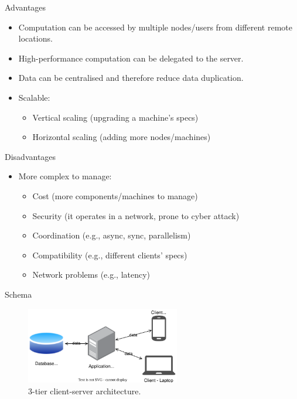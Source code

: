 \documentclass[aspectratio=169, table]{beamer}
\begin{document}
	\begin{frame}{Advantages}
		\begin{itemize}
			\item Computation can be accessed by multiple nodes/users from different remote locations.
			\item High-performance computation can be delegated to the server.
			\item Data can be centralised and therefore reduce data duplication.
			\item Scalable:
			\begin{itemize}
				\item Vertical scaling (upgrading a machine's specs)
				\item Horizontal scaling (adding more nodes/machines)
			\end{itemize}
		\end{itemize}
	\end{frame}
	
	\begin{frame}{Disadvantages}
		\begin{itemize}
			\item More complex to manage:
			\begin{itemize}
				\item Cost (more components/machines to manage)
				\item Security (it operates in a network, prone to cyber attack)
				\item Coordination (e.g., async, sync, parallelism)
				\item Compatibility (e.g., different clients' specs)
				\item Network problems (e.g., latency)
			\end{itemize}
		\end{itemize}
	\end{frame}
	
	\begin{frame}{Schema}
		\begin{figure}[h]
			\centering
			\includegraphics[width=0.6\textwidth]{client-server-3-tier}
			\caption{3-tier client-server architecture.}
			\label{fig:client-server-schema}
		\end{figure}
	\end{frame}
	
\end{document}

